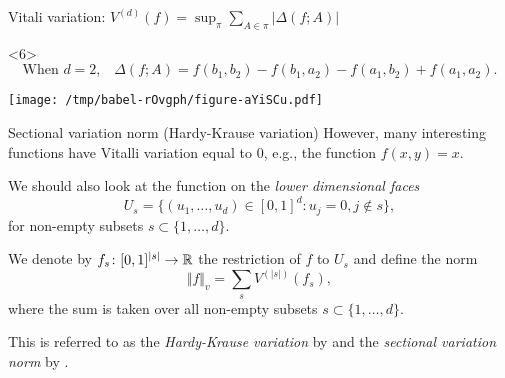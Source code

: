 \documentclass[smaller]{beamer}\usepackage{listings}
\begin{document}
\begin{frame}[label={sec:org9dab891}]{Vitali variation: \normalsize \(V^{(d)}(f) = \sup_{\pi} \sum_{A \in \pi} | \Delta(f;A)|\)}
\begin{onlyenv}<6>
\small
\color{black}
\begin{equation*}
  \text{When \(d=2\),} \quad 
  \Delta(f;A) = f(b_1, b_2) - f(b_1, a_2) - f(a_1, b_2) + f(a_1, a_2).
\end{equation*}
\color{black}

\vfill

\begin{center}
\texttt{[image: /tmp/babel-rOvgph/figure-aYiSCu.pdf]}
\end{center}
\end{onlyenv}
\end{frame}


\begin{frame}[label={sec:org14a0bfa}]{Sectional variation norm (Hardy-Krause variation)}
However, many interesting functions have Vitalli variation equal to 0, e.g., the
function $f(x,y) = x$.

\vfill \pause We should also look at the function on the \textit{lower dimensional faces}
\begin{equation*}
  U_s = \{(u_1, \dots, u_d) \in [0,1]^d : u_j = 0, j \not\in s \},
\end{equation*}
for non-empty subsets \(s \subset \{1, \dots, d\}\).

\vfill \pause
We denote by \(f_s \colon [0,1]^{|s|} \rightarrow \mathbb{R}\) the restriction of \(f\)
to \(U_s\) and define the norm
\begin{equation*}
  \Vert f \Vert_{v} = \sum_{s} V^{(|s|)}(f_s),
\end{equation*}
where the sum is taken over all non-empty subsets \(s \subset \{1, \dots, d\}\).

\vfill

This is referred to as the \emph{Hardy-Krause variation} by
\cite{fang2021multivariate} and the \emph{sectional variation norm} by
\cite{van2017generally}.
\end{frame}
\end{document}

